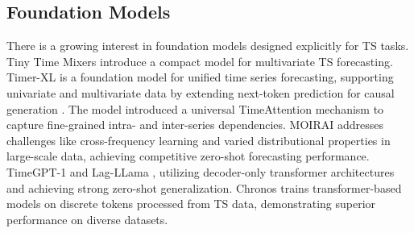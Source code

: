 \subsection{Foundation Models}

There is a growing interest in foundation models designed explicitly for TS tasks. 
Tiny Time Mixers \cite{ekambaram2024ttms} introduce a compact model for multivariate TS forecasting.
Timer-XL is a foundation model for unified time series forecasting, supporting univariate and multivariate data by extending next-token prediction for causal generation \cite{liu2024timer}.
The model introduced a universal TimeAttention mechanism to capture fine-grained intra- and inter-series dependencies.
MOIRAI \cite{woo2024unified} addresses challenges like cross-frequency learning and varied distributional properties in large-scale data, achieving competitive zero-shot forecasting performance.
TimeGPT-1 \cite{garza2023timegpt} and Lag-LLama \cite{rasul2023lag}, utilizing decoder-only transformer architectures and achieving strong zero-shot generalization.
Chronos \cite{ansari2024chronos} trains transformer-based models on discrete tokens processed from TS data, demonstrating superior performance on diverse datasets.
